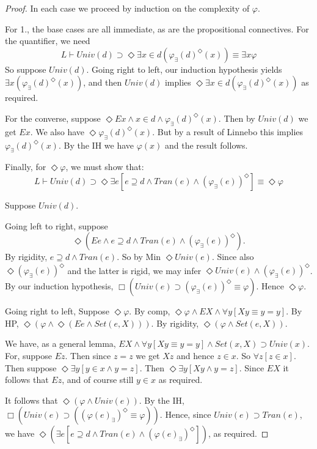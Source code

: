 \documentclass{article}
\begin{document}
\begin{proof}
    In each case we proceed by induction on the complexity of $\varphi$.

    For 1., the base cases are all immediate, as are the propositional connectives. 
    For the quantifier, we need 
    $$L \vdash Univ(d) \supset 
    \Diamond \exists x \in d(\varphi_\exists(d)^\Diamond(x)) 
    \equiv 
    \exists x \varphi$$
    So suppose $Univ(d)$. Going right to left, our induction hypothesis 
    yields $\exists x (\varphi_\exists(d)^\Diamond(x))$, and then $Univ(d)$ 
    implies $\Diamond \exists x \in d (\varphi_\exists(d)^\Diamond(x))$ as 
    required. 

    For the converse, suppose 
    $\Diamond Ex \wedge x \in d \wedge \varphi_\exists(d)^\Diamond(x)$.
    Then by $Univ(d)$ we get $Ex$. We also have $\Diamond \varphi_\exists(d)^\Diamond(x)$.
    But by a result of Linnebo this implies $\varphi_\exists(d)^\Diamond(x)$.
    By the IH we have $\varphi(x)$ and the result follows.

    Finally, for $\Diamond \varphi$, we must show that:
    $$L \vdash Univ(d) \supset 
    \Diamond \exists e [e \supseteq d \wedge Tran(e) \wedge (\varphi_\exists(e))^\Diamond]
    \equiv 
    \Diamond \varphi$$

    Suppose $Univ(d)$. 
    
    Going left to right, suppose
    $$\Diamond (Ee \wedge e \supseteq d \wedge Tran(e) \wedge (\varphi_\exists(e))^\Diamond).$$
    By rigidity, $e \supseteq d \wedge Tran(e)$. So by Min $\Diamond Univ(e)$. Since also 
    $\Diamond (\varphi_\exists(e))^\Diamond$ and the latter is rigid, we may infer 
    $\Diamond Univ(e) \wedge (\varphi_\exists(e))^\Diamond$.
    By our induction hypothesis, 
    $\Box (Univ(e) \supset (\varphi_\exists(e))^\Diamond \equiv \varphi)$.
    Hence $\Diamond \varphi$. 
    
    Going right to left,
    Suppose $\Diamond \varphi$. By comp, 
    $\Diamond \varphi \wedge EX \wedge \forall y[Xy \equiv y = y]$.
    By HP, 
    $\Diamond (\varphi \wedge \Diamond (Ee \wedge Set(e, X)))$.
    By rigidity, $\Diamond (\varphi \wedge Set(e, X))$.

    We have, as a general lemma,
    $EX \wedge \forall y[Xy \equiv y = y] \wedge Set(x, X) \supset Univ(x)$.
    For, suppose $Ez$. Then since $z = z$ we get $Xz$ and hence $z \in x$. So 
    $\forall z[z \in x]$. Then suppose $\Diamond \exists y[y \in x \wedge y = z]$. 
    Then $\Diamond \exists y[Xy \wedge y = z]$. Since $EX$ it follows that $Ez$, 
    and of course still $y \in x$ as required.

    It follows that $\Diamond (\varphi \wedge Univ(e))$. By the IH, 
    $\Box (Univ(e) \supset ((\varphi(e)_\exists)^\Diamond \equiv \varphi))$. Hence,
    since $Univ(e) \supset Tran(e)$, we have 
    $\Diamond (\exists e[e  \supseteq d \wedge Tran(e) \wedge (\varphi(e)_\exists)^\Diamond])$,
    as required.

    

\end{proof}
\end{document}
